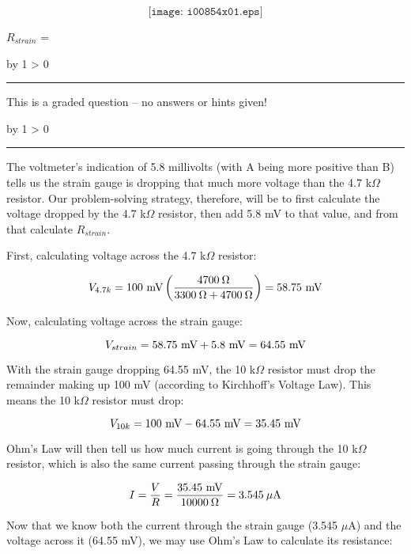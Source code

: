 \documentclass[12pt,a4paper]{article}
\def\svar{
           \advance\answnum by 1
           \ifnum \answnum > 0
                \hrule
                \vskip 3pt
                \leftline{Svar \the\answnum}
                \vskip 3pt \fi}
\def\notes{
           \advance\explnum by 1
           \ifnum \explnum > 0
                \hrule
                \vskip 3pt
                \leftline{Notes \the\explnum}
                \vskip 3pt \fi}
\begin{document}
$$\texttt{[image: i00854x01.eps]}$$

$R_{strain}$ = \underbar{\hskip 50pt}

\vfil 

\eject
\vskip 10pt \filbreak 





\svar{} 

This is a graded question -- no answers or hints given!

\vskip 10pt \filbreak 





\notes{} 

The voltmeter's indication of 5.8 millivolts (with A being more positive than B) tells us the strain gauge is dropping that much more voltage than the 4.7 k$\Omega$ resistor.  Our problem-solving strategy, therefore, will be to first calculate the voltage dropped by the 4.7 k$\Omega$ resistor, then add 5.8 mV to that value, and from that calculate $R_{strain}$.

\vskip 10pt

First, calculating voltage across the 4.7 k$\Omega$ resistor:

$$V_{4.7k} = 100 \hbox{ mV} \left(4700 \> \Omega \over {3300 \> \Omega + 4700 \> \Omega}\right) = 58.75 \hbox{ mV}$$

Now, calculating voltage across the strain gauge:

$$V_{strain} = 58.75 \hbox{ mV} + 5.8 \hbox{ mV} = 64.55 \hbox{ mV}$$

With the strain gauge dropping 64.55 mV, the 10 k$\Omega$ resistor must drop the remainder making up 100 mV (according to Kirchhoff's Voltage Law).  This means the 10 k$\Omega$ resistor must drop:

$$V_{10k} = 100 \hbox{ mV} - 64.55 \hbox{ mV} = 35.45 \hbox{ mV}$$

Ohm's Law will then tell us how much current is going through the 10 k$\Omega$ resistor, which is also the same current passing through the strain gauge:

$$I = {V \over R} = {35.45 \hbox{ mV} \over 10000 \> \Omega} = 3.545 \> \mu\hbox{A}$$

Now that we know both the current through the strain gauge (3.545 $\mu$A) and the voltage across it (64.55 mV), we may use Ohm's Law to calculate its resistance:
\end{document}

